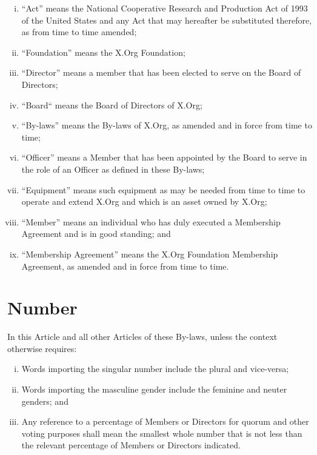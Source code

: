 \documentclass[10pt, english]{bylaws}
\begin{document}
\begin{enumerate}[(i)\hspace{.2cm}]
	\item ``Act'' means the National Cooperative Research and Production Act
	of 1993 of the United States and any Act that may hereafter be
	substituted therefore, as from time to time amended;

	\item ``Foundation'' means the X.Org Foundation;

	\item ``Director'' means a member that has been elected to serve on the
	Board of Directors;

	\item ``Board`` means the Board of Directors of X.Org;

	\item ``By-laws'' means the By-laws of X.Org, as amended and in force
	from time to time;

	\item ``Officer'' means a Member that has been appointed by the Board to
	serve in the role of an Officer as defined in these By-laws;

	\item ``Equipment'' means such equipment as may be needed from time to
	time to operate and extend X.Org and which is an asset owned by X.Org;

	\item ``Member'' means an individual who has duly executed a Membership
	Agreement and is in good standing; and

	\item ``Membership Agreement'' means the X.Org Foundation Membership
	Agreement, as amended and in force from time to time.
\end{enumerate}

\section{Number}
In this Article and all other Articles of these By-laws, unless the context
otherwise requires:

\begin{enumerate}[(i)\hspace{.2cm}]
	\item Words importing the singular number include the plural and
		vice-versa;

	\item Words importing the masculine gender include the feminine and
	neuter genders; and

	\item Any reference to a percentage of Members or Directors for quorum
	and other voting purposes shall mean the smallest whole number
	that is not less than the relevant percentage of Members or Directors
	indicated.
\end{enumerate}
\end{document}
